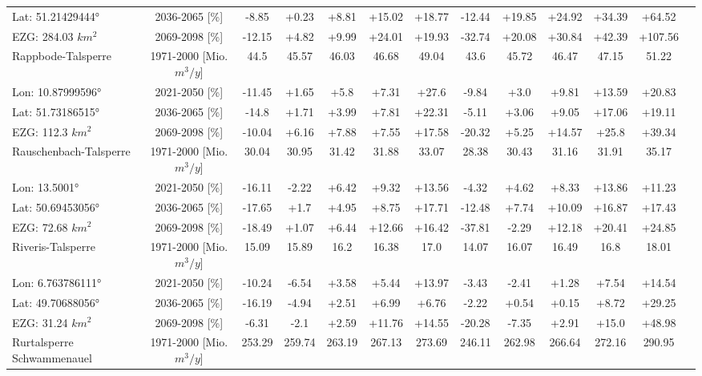 \begin{longtable}{@{\extracolsep{\fill}}lc|ccccc||cccccc}
Lat: 51.21429444° & 2036-2065 [\%]  & -8.85 & +0.23 & +8.81 & +15.02 & +18.77 & -12.44 & +19.85 & +24.92 & +34.39 & +64.52 & \\ 
EZG: 284.03 $km^2$ & 2069-2098 [\%]  & -12.15 & +4.82 & +9.99 & +24.01 & +19.93 & -32.74 & +20.08 & +30.84 & +42.39 & +107.56 & \\ 
\hline 
Rappbode-Talsperre & 1971-2000 [Mio. $m^3/y$]  & 44.5 & 45.57 & 46.03 & 46.68 & 49.04 & 43.6 & 45.72 & 46.47 & 47.15 & 51.22 & \\ 
\cline{2-13} 
Lon: 10.87999596° & 2021-2050 [\%]  & -11.45 & +1.65 & +5.8 & +7.31 & +27.6 & -9.84 & +3.0 & +9.81 & +13.59 & +20.83 & \\ 
Lat: 51.73186515° & 2036-2065 [\%]  & -14.8 & +1.71 & +3.99 & +7.81 & +22.31 & -5.11 & +3.06 & +9.05 & +17.06 & +19.11 & \\ 
EZG: 112.3 $km^2$ & 2069-2098 [\%]  & -10.04 & +6.16 & +7.88 & +7.55 & +17.58 & -20.32 & +5.25 & +14.57 & +25.8 & +39.34 & \\ 
\hline 
Rauschenbach-Talsperre & 1971-2000 [Mio. $m^3/y$]  & 30.04 & 30.95 & 31.42 & 31.88 & 33.07 & 28.38 & 30.43 & 31.16 & 31.91 & 35.17 & \\ 
\cline{2-13} 
Lon: 13.5001° & 2021-2050 [\%]  & -16.11 & -2.22 & +6.42 & +9.32 & +13.56 & -4.32 & +4.62 & +8.33 & +13.86 & +11.23 & \\ 
Lat: 50.69453056° & 2036-2065 [\%]  & -17.65 & +1.7 & +4.95 & +8.75 & +17.71 & -12.48 & +7.74 & +10.09 & +16.87 & +17.43 & \\ 
EZG: 72.68 $km^2$ & 2069-2098 [\%]  & -18.49 & +1.07 & +6.44 & +12.66 & +16.42 & -37.81 & -2.29 & +12.18 & +20.41 & +24.85 & \\ 
\hline 
Riveris-Talsperre & 1971-2000 [Mio. $m^3/y$]  & 15.09 & 15.89 & 16.2 & 16.38 & 17.0 & 14.07 & 16.07 & 16.49 & 16.8 & 18.01 & \\ 
\cline{2-13} 
Lon: 6.763786111° & 2021-2050 [\%]  & -10.24 & -6.54 & +3.58 & +5.44 & +13.97 & -3.43 & -2.41 & +1.28 & +7.54 & +14.54 & \\ 
Lat: 49.70688056° & 2036-2065 [\%]  & -16.19 & -4.94 & +2.51 & +6.99 & +6.76 & -2.22 & +0.54 & +0.15 & +8.72 & +29.25 & \\ 
EZG: 31.24 $km^2$ & 2069-2098 [\%]  & -6.31 & -2.1 & +2.59 & +11.76 & +14.55 & -20.28 & -7.35 & +2.91 & +15.0 & +48.98 & \\ 
\hline 
Rurtalsperre Schwammenauel & 1971-2000 [Mio. $m^3/y$]  & 253.29 & 259.74 & 263.19 & 267.13 & 273.69 & 246.11 & 262.98 & 266.64 & 272.16 & 290.95 & \\ 

\end{longtable}
